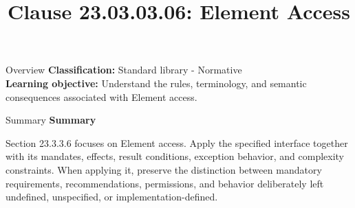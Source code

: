 \documentclass[10pt,letterpaper]{article}
\title{Clause 23.03.03.06: Element Access}
\author{}
\date{}
\begin{document}
\maketitle
\begin{CornellOverviewBox}{Overview}
\textbf{Classification:} Standard library - Normative\\[2pt]
\textbf{Learning objective:} Understand the rules, terminology, and semantic consequences associated with Element access.
\end{CornellOverviewBox}\begin{CornellSummaryBox}{Summary}
{\sffamily\bfseries\color{Accent} Summary}\par\vspace{3pt}Section 23.3.3.6 focuses on Element access. Apply the specified interface together with its mandates, effects, result conditions, exception behavior, and complexity constraints. When applying it, preserve the distinction between mandatory requirements, recommendations, permissions, and behavior deliberately left undefined, unspecified, or implementation-defined.
\end{CornellSummaryBox}
\end{document}
